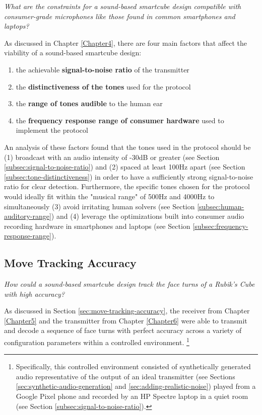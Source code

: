 \emph{What are the constraints for a sound-based smartcube design
compatible with consumer-grade microphones like those found in common
smartphones and laptops?}

As discussed in Chapter \ref{Chapter4}, there are four main factors
that affect the viability of a sound-based smartcube design: 

\begin{enumerate}
    \item the achievable \textbf{signal-to-noise ratio} of the transmitter
    \item the \textbf{distinctiveness of the tones} used for the protocol
    \item the \textbf{range of tones audible} to the human ear
    \item the \textbf{frequency response range of consumer hardware} used to implement the protocol
\end{enumerate}

An analysis of these factors found that the tones used in the protocol
should be (1) broadcast with an audio intensity of -30dB or greater
(see Section \ref{subsec:signal-to-noise-ratio}) and (2) spaced at
least 100Hz apart (see Section \ref{subsec:tone-distinctiveness}) in
order to have a sufficiently strong signal-to-noise ratio for clear
detection. Furthermore, the specific tones chosen for the protocol
would ideally fit within the "musical range" of 500Hz and 4000Hz to
simultaneously (3) avoid irritating human solvers (see Section
\ref{subsec:human-auditory-range}) and (4) leverage the optimizations
built into consumer audio recording hardware in smartphones and laptops
(see Section \ref{subsec:frequency-response-range}).

\subsection{Move Tracking Accuracy}
\label{subsec:answer-accuracy}

\emph{How could a sound-based smartcube design track the face turns of
a Rubik's Cube with high accuracy?}

As discussed in Section \ref{sec:move-tracking-accuracy}, the receiver
from Chapter \ref{Chapter5} and the transmitter from Chapter
\ref{Chapter6} were able to transmit and decode a sequence of face
turns with perfect accuracy across a variety of configuration
parameters within a controlled environment. \footnote{Specifically,
this controlled environment consisted of synthetically generated audio
representative of the output of an ideal transmitter (see Sections
\ref{sec:synthetic-audio-generation} and
\ref{sec:adding-realistic-noise}) played from a Google Pixel phone and
recorded by an HP Spectre laptop in a quiet room (see Section
\ref{subsec:signal-to-noise-ratio}).}

